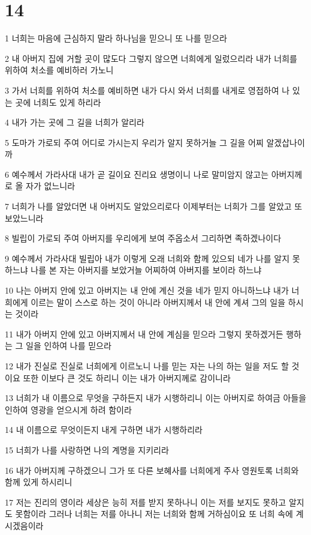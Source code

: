 \chapter{14}

\par 1 너희는 마음에 근심하지 말라 하나님을 믿으니 또 나를 믿으라
\par 2 내 아버지 집에 거할 곳이 많도다 그렇지 않으면 너희에게 일렀으리라 내가 너희를 위하여 처소를 예비하러 가노니
\par 3 가서 너희를 위하여 처소를 예비하면 내가 다시 와서 너희를 내게로 영접하여 나 있는 곳에 너희도 있게 하리라
\par 4 내가 가는 곳에 그 길을 너희가 알리라
\par 5 도마가 가로되 주여 어디로 가시는지 우리가 알지 못하거늘 그 길을 어찌 알겠삽나이까
\par 6 예수께서 가라사대 내가 곧 길이요 진리요 생명이니 나로 말미암지 않고는 아버지께로 올 자가 없느니라
\par 7 너희가 나를 알았더면 내 아버지도 알았으리로다 이제부터는 너희가 그를 알았고 또 보았느니라
\par 8 빌립이 가로되 주여 아버지를 우리에게 보여 주옵소서 그리하면 족하겠나이다
\par 9 예수께서 가라사대 빌립아 내가 이렇게 오래 너희와 함께 있으되 네가 나를 알지 못하느냐 나를 본 자는 아버지를 보았거늘 어찌하여 아버지를 보이라 하느냐
\par 10 나는 아버지 안에 있고 아버지는 내 안에 계신 것을 네가 믿지 아니하느냐 내가 너희에게 이르는 말이 스스로 하는 것이 아니라 아버지께서 내 안에 계셔 그의 일을 하시는 것이라
\par 11 내가 아버지 안에 있고 아버지께서 내 안에 계심을 믿으라 그렇지 못하겠거든 행하는 그 일을 인하여 나를 믿으라
\par 12 내가 진실로 진실로 너희에게 이르노니 나를 믿는 자는 나의 하는 일을 저도 할 것이요 또한 이보다 큰 것도 하리니 이는 내가 아버지께로 감이니라
\par 13 너희가 내 이름으로 무엇을 구하든지 내가 시행하리니 이는 아버지로 하여금 아들을 인하여 영광을 얻으시게 하려 함이라
\par 14 내 이름으로 무엇이든지 내게 구하면 내가 시행하리라
\par 15 너희가 나를 사랑하면 나의 계명을 지키리라
\par 16 내가 아버지께 구하겠으니 그가 또 다른 보혜사를 너희에게 주사 영원토록 너희와 함께 있게 하시리니
\par 17 저는 진리의 영이라 세상은 능히 저를 받지 못하나니 이는 저를 보지도 못하고 알지도 못함이라 그러나 너희는 저를 아나니 저는 너희와 함께 거하심이요 또 너희 속에 계시겠음이라
